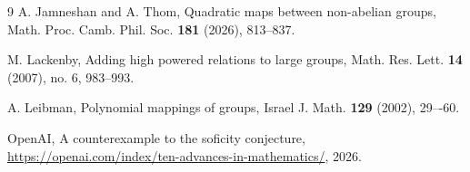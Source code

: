 \documentclass[a4paper,12pt]{amsart}
\theoremstyle{plain}
\theoremstyle{definition}
\theoremstyle{remark}
\numberwithin{equation}{subsection}
\begin{document}
\begin{thebibliography}{9}
     A. Jamneshan and A. Thom, 
    Quadratic maps between non-abelian groups, 
    Math. Proc. Camb. Phil. Soc. {\bf 181} (2026), 813--837.

    M. Lackenby,
    Adding high powered relations to large groups,
    Math. Res. Lett. {\bf 14} (2007), no. 6, 983--993. 

    A. Leibman, 
    Polynomial mappings of groups, 
    Israel J. Math. {\bf 129} (2002), 29–-60. 



    OpenAI, 
    A counterexample to the soficity conjecture, 
    \url{https://openai.com/index/ten-advances-in-mathematics/}, 2026.

\end{thebibliography}
\end{document}
